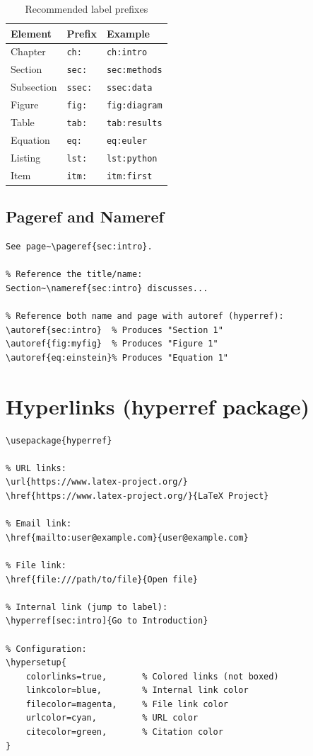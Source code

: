 \begin{table}[H]
\centering
\begin{tabular}{lll}
\toprule
\textbf{Element} & \textbf{Prefix} & \textbf{Example} \\
\midrule
Chapter    & \texttt{ch:}  & \texttt{ch:intro} \\
Section    & \texttt{sec:} & \texttt{sec:methods} \\
Subsection & \texttt{ssec:} & \texttt{ssec:data} \\
Figure     & \texttt{fig:} & \texttt{fig:diagram} \\
Table      & \texttt{tab:} & \texttt{tab:results} \\
Equation   & \texttt{eq:}  & \texttt{eq:euler} \\
Listing    & \texttt{lst:} & \texttt{lst:python} \\
Item       & \texttt{itm:} & \texttt{itm:first} \\
\bottomrule
\end{tabular}
\caption{Recommended label prefixes}
\end{table}

\subsection{Pageref and Nameref}

\begin{lstlisting}[language={[LaTeX]TeX}, caption=Other reference commands]
% Reference the page number:
See page~\pageref{sec:intro}.

% Reference the title/name:
Section~\nameref{sec:intro} discusses...

% Reference both name and page with autoref (hyperref):
\autoref{sec:intro}  % Produces "Section 1"
\autoref{fig:myfig}  % Produces "Figure 1"
\autoref{eq:einstein}% Produces "Equation 1"
\end{lstlisting}

\section{Hyperlinks (hyperref package)}

\begin{lstlisting}[language={[LaTeX]TeX}, caption=Hyperlinks]
\usepackage{hyperref}

% URL links:
\url{https://www.latex-project.org/}
\href{https://www.latex-project.org/}{LaTeX Project}

% Email link:
\href{mailto:user@example.com}{user@example.com}

% File link:
\href{file:///path/to/file}{Open file}

% Internal link (jump to label):
\hyperref[sec:intro]{Go to Introduction}

% Configuration:
\hypersetup{
    colorlinks=true,       % Colored links (not boxed)
    linkcolor=blue,        % Internal link color
    filecolor=magenta,     % File link color
    urlcolor=cyan,         % URL color
    citecolor=green,       % Citation color
}
\end{lstlisting}

